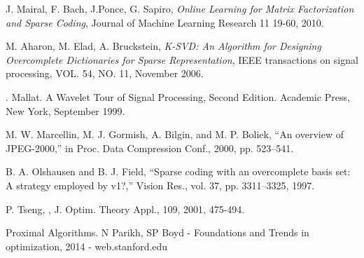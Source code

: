 \documentclass[a4paper,11pt]{article}
\begin{document}
\begin{thebibliography}{9}
  J. Mairal, F. Bach, J.Ponce, G. Sapiro,
  \emph{Online Learning for Matrix Factorization and Sparse Coding},
  Journal of Machine Learning Research 11 19-60, 2010.

  M. Aharon, M. Elad, A. Bruckstein,
  \emph{K-SVD: An Algorithm for Designing Overcomplete Dictionaries for Sparse Representation},
  IEEE transactions on signal processing, VOL. 54, NO. 11, November 2006.

. Mallat. A Wavelet Tour of Signal Processing, Second Edition. Academic Press, New York,
September 1999.


M. W. Marcellin, M. J. Gormish, A. Bilgin, and M. P. Boliek, “An
overview of JPEG-2000,” in Proc. Data Compression Conf., 2000, pp.
523–541.

B. A. Olshausen and B. J. Field, “Sparse coding with an overcomplete
basis set: A strategy employed by v1?,” Vision Res., vol. 37, pp.
3311–3325, 1997.



P. Tseng, , J. Optim. Theory Appl., 109, 2001, 475-494.

Proximal Algorithms.
N Parikh, SP Boyd - Foundations and Trends in optimization, 2014 - web.stanford.edu

\end{thebibliography}
\end{document}
